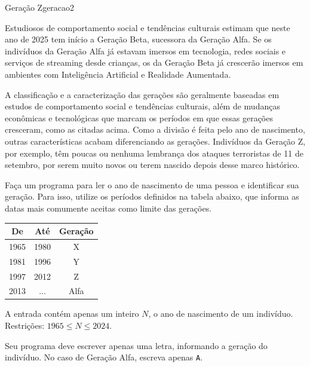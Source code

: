 \documentclass[12pt,a4paper,oneside]{article}
\begin{document}
\begin{problem}{Geração Z}{geracao}{2}

Estudiosos de comportamento social e tendências culturais estimam que neste ano de 2025 tem início a Geração Beta, sucessora da Geração Alfa. Se os indivíduos da Geração Alfa já estavam imersos em tecnologia, redes sociais e serviços de streaming desde crianças, os da Geração Beta já crescerão imersos em ambientes com Inteligência Artificial e Realidade Aumentada. 

A classificação e a caracterização das gerações são geralmente baseadas em estudos de comportamento social e tendências culturais, além de mudanças econômicas e tecnológicas que marcam os períodos em que essas gerações cresceram, como as citadas acima. Como a divisão é feita pelo ano de nascimento, outras características acabam diferenciando as gerações.  Indivíduos da Geração Z, por exemplo, têm poucas ou nenhuma lembrança dos ataques terroristas de 11 de setembro, por serem muito novos ou terem nascido depois desse marco histórico.

Faça um programa para ler o ano de nascimento de uma pessoa e identificar sua geração. Para isso, utilize os períodos definidos na tabela abaixo, que informa as datas mais comumente aceitas como limite das gerações.

\begin{center}
\begin{tabular}{ccc}
    De & Até & Geração\\
    \hline
    1965 & 1980 & X \\
    1981 & 1996 & Y \\
    1997 & 2012 & Z \\
    2013 & ... & Alfa
\end{tabular}
\end{center}

%

\InputFile

A entrada contém apenas um inteiro $N$, o ano de  nascimento de um indivíduo. Restrições: $1965 \leq N \leq 2024$.


\OutputFile

Seu programa deve escrever apenas uma letra, informando a geração do indivíduo. No caso de Geração Alfa, escreva apenas \texttt{A}.


\Example

\begin{example}
%
\end{example}

\begin{example}
%
\end{example}

\begin{example}
%
\end{example}

\begin{example}
%
\end{example}


\end{problem}
\end{document}
